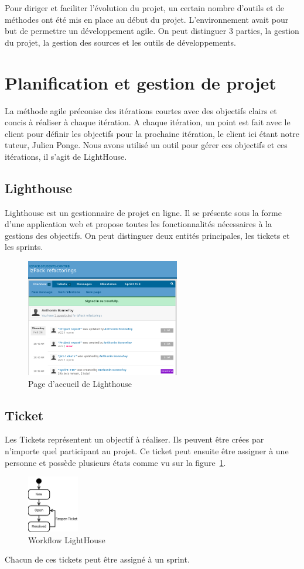 Pour diriger et faciliter l'évolution du projet, un certain nombre d'outils et de méthodes ont été mis en place au début du projet.
L'environnement avait pour but de permettre un développement agile.
On peut distinguer 3 parties, la gestion du projet, la gestion des sources et les outils de développements.
\section{Planification et gestion de projet}
La méthode agile préconise des itérations courtes avec des objectifs clairs et concis à réaliser à chaque itération.
A chaque itération, un point est fait avec le client pour définir les objectifs pour la prochaine itération, le client ici étant notre tuteur, Julien Ponge.
Nous avons utilisé un outil pour gérer ces objectifs et ces itérations, il s'agit de LightHouse.
\subsection{Lighthouse}
Lighthouse est un gestionnaire de projet en ligne.
Il se présente sous la forme d'une application web et propose toutes les fonctionnalités nécessaires à la gestions des objectifs.
On peut distinguer deux entités principales, les tickets et les sprints.
\begin{figure}[H]
	\centering
	\includegraphics[width=0.6\textwidth]{../image/lighthouse.png}
	\caption{Page d'accueil de Lighthouse}
\end{figure}
\subsection{Ticket}
Les Tickets représentent un objectif à réaliser.
Ils peuvent être crées par n'importe quel participant au projet. 
Ce ticket peut ensuite être assigner à une personne et possède plusieurs états comme vu sur la figure~\ref{fig:workflow}.
\begin{figure}[H]
	\centering
	\includegraphics[width=0.2\textwidth]{../image/lighthouseWorkFlow.png}
	\caption{Workflow LightHouse}
\label{fig:workflow}
\end{figure}
Chacun de ces tickets peut être assigné à un sprint.
